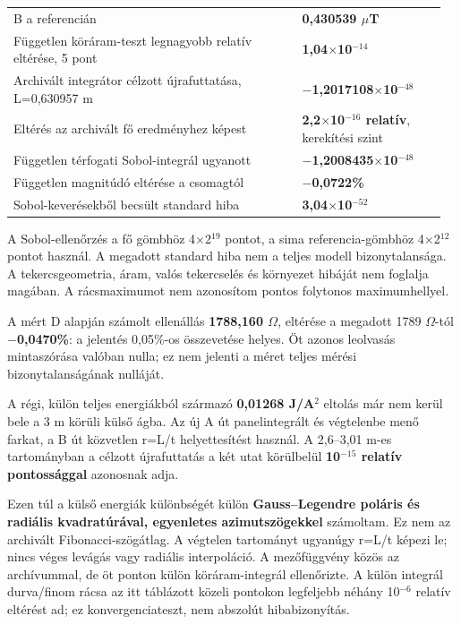 \documentclass[10pt,a4paper]{article}
\begin{document}
{\begin{center}
{\begin{tabular}{@{}>{\raggedright\arraybackslash}p{0.64\linewidth}>{\raggedleft\arraybackslash}p{0.32\linewidth}@{}}
B a referencián & \textbf{0,430539 $\mu$T} \\
Független köráram-teszt legnagyobb relatív eltérése, 5 pont & \textbf{1,04$\times$10$^{-14}$} \\
Archivált integrátor célzott újrafuttatása, L=0,630957 m & \textbf{$-$1,2017108$\times$10$^{-48}$} \\
Eltérés az archivált fő eredményhez képest & \textbf{2,2$\times$10$^{-16}$ relatív}, kerekítési szint \\
Független térfogati Sobol-integrál ugyanott & \textbf{$-$1,2008435$\times$10$^{-48}$} \\
Független magnitúdó eltérése a csomagtól & \textbf{$-$0,0722\%} \\
Sobol-keverésekből becsült standard hiba & \textbf{3,04$\times$10$^{-52}$} \\
\bottomrule\end{tabular}}\vspace{-2pt}\end{center}
\par
A Sobol-ellenőrzés a fő gömbhöz 4$\times$2$^{19}$ pontot, a sima referencia-gömbhöz 4$\times$2$^{12}$ pontot használ. A megadott standard hiba nem a teljes modell bizonytalansága. A tekercsgeometria, áram, valós tekercselés és környezet hibáját nem foglalja magában. A rácsmaximumot nem azonosítom pontos folytonos maximumhellyel.
\par
A mért D alapján számolt ellenállás \textbf{1788,160 $\Omega$}, eltérése a megadott 1789 $\Omega$-tól \textbf{$-$0,0470\%}: a jelentés 0,05\%-os összevetése helyes. Öt azonos leolvasás mintaszórása valóban nulla; ez nem jelenti a méret teljes mérési bizonytalanságának nulláját.
\par
\vspace{2pt}\par\vspace{0.5pt}
\par
A régi, külön teljes energiákból származó \textbf{0,01268 J/A$^2$} eltolás már nem kerül bele a 3 m körüli külső ágba. Az új A út panelintegrált és végtelenbe menő farkat, a B út közvetlen r=L/t helyettesítést használ. A 2,6--3,01 m-es tartományban a célzott újrafuttatás a két utat körülbelül \textbf{10$^{-15}$ relatív pontossággal} azonosnak adja.
\par
Ezen túl a külső energiák különbségét külön \textbf{Gauss--Legendre poláris és radiális kvadratúrával, egyenletes azimutszögekkel} számoltam. Ez nem az archivált Fibonacci-szögátlag. A végtelen tartományt ugyanúgy r=L/t képezi le; nincs véges levágás vagy radiális interpoláció. A mezőfüggvény közös az archívummal, de öt ponton külön köráram-integrál ellenőrizte. A külön integrál durva/finom rácsa az itt táblázott közeli pontokon legfeljebb néhány 10$^{-6}$ relatív eltérést ad; ez konvergenciateszt, nem abszolút hibabizonyítás.
}
\end{document}
